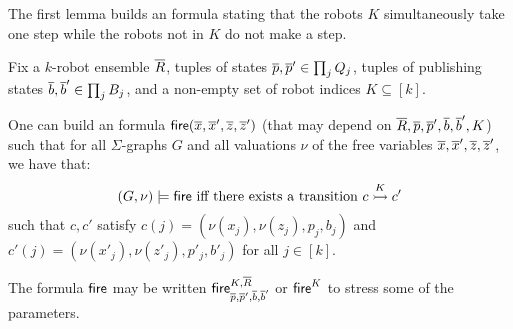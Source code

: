 The first lemma builds an \msol formula stating that the robots $K$ simultaneously take one step while the robots not in $K$ do not make a step.  

\begin{lemma} \label{lem:istep}
Fix a $k$-robot ensemble $\tup{R}$, tuples of states $\tup{p},\tup{p}' \in \prod_j Q_j$, tuples of publishing states 
$\tup{b},\tup{b}' \in \prod_j B_j$, and a non-empty set of robot indices $K \subseteq [k]$.

One can build an \msol formula $\fire(\tup{x},\tup{x}',\tup{z},\tup{z}')$ (that may depend on $\tup{R}, \tup{p}, \tup{p}', \tup{b}, \tup{b}', K$) 
such that for all $\Sigma$-graphs $G$ and all valuations $\nu$ of the free variables $\tup{x},\tup{x}',\tup{z},\tup{z}'$, 
we have that:
\[
 (G,\nu) \models \fire \mbox{ iff there exists a transition } \onestep{c}{c'}{K} 
\]
such that 
$c,c'$ satisfy $c(j) = 	(\nu(x_j),	\nu(z_j),		p_j,		b_j)$ and $c'(j) =	(\nu(x'_j),	\nu(z'_j),	p'_j,	b'_j)$ for all $j \in [k]$.

The formula $\fire$ may be written $\fire_{\tup{p},\tup{p}',\tup{b},\tup{b}'}^{K,\tup{R}}$ or $\fire^K$ to stress some of the parameters.
\end{lemma}

